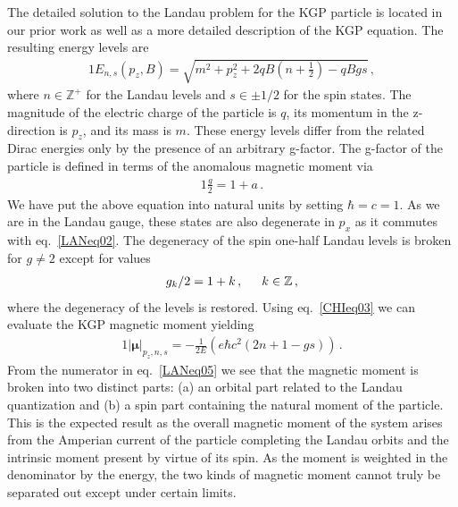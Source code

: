 \documentclass[
aps,
pra,
showpacs,
preprintnumbers,
amsmath,
amssymb,
footinbib
]{revtex4-2}
\begin{document}
The detailed solution to the Landau problem for the KGP particle is located in our prior work as well as a more detailed description of the KGP equation. The resulting energy levels are
\begin{alignat}{1}
    \label{EnergyKGP} E_{n,s}(p_{z},B) = \sqrt{m^{2}+p_{z}^{2}+2qB\left(n+\frac{1}{2}\right)-qBgs}\,,
\end{alignat}
where $n\in\mathbb{Z^{+}}$ for the Landau levels and $s\in\pm1/2$ for the spin states. The magnitude of the electric charge of the particle is $q$, its momentum in the z-direction is $p_{z}$, and its mass is $m$. These energy levels differ from the related Dirac energies only by the presence of an arbitrary g-factor. The g-factor of the particle is defined in terms of the anomalous magnetic moment via
\begin{alignat}{1}
    \label{gFactor} \frac{g}{2}=1+a\,.
\end{alignat}
We have put the above equation into natural units by setting $\hbar=c=1$. As we are in the Landau gauge, these states are also degenerate in $p_{x}$ as it commutes with eq.~\eqref{LANeq02}. The degeneracy of the spin one-half Landau levels is broken for $g\neq2$ except for values
\begin{alignat}{1}
  \label{LANeq04} g_{k}/2=1+k\,,\indent k\in\mathbb{Z}\,,
\end{alignat}
where the degeneracy of the levels is restored. Using eq.~\eqref{CHIeq03} we can evaluate the KGP magnetic moment yielding
\begin{alignat}{1}
  \label{LANeq05} \left|\boldsymbol{\mu}\right|_{p_{z},n,s}=-\frac{1}{2E}\left(e\hbar c^{2}(2n+1-gs)\right)\,.
\end{alignat}
From the numerator in eq.~\eqref{LANeq05} we see that the magnetic moment is broken into two distinct parts: (a) an orbital part related to the Landau quantization and (b) a spin part containing the natural moment of the particle. This is the expected result as the overall magnetic moment of the system arises from the Amperian current of the particle completing the Landau orbits and the intrinsic moment present by virtue of its spin. As the moment is weighted in the denominator by the energy, the two kinds of magnetic moment cannot truly be separated out except under certain limits.
\end{document}
